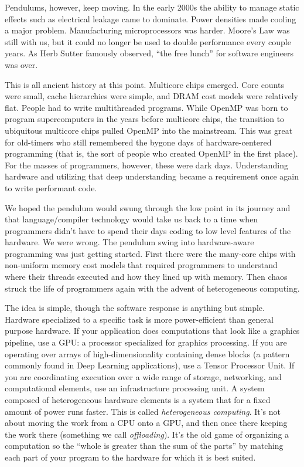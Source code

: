 Pendulums, however, keep moving.  In the early 2000s the ability to manage static effects such as electrical
leakage came to dominate.   Power densities made cooling a major problem.  Manufacturing  microprocessors was harder. Moore's Law was 
still with us, but it could no longer be used to double performance every couple years.
As Herb Sutter famously observed, ``the free lunch'' for software engineers was over. 

This is all ancient history at this point.  Multicore chips emerged.  Core counts were small, cache hierarchies were 
simple, and DRAM cost models were relatively flat.   People had to write multithreaded programs.   While OpenMP
was born to program supercomputers in the years before multicore chips,
the transition to ubiquitous multicore chips pulled OpenMP into the mainstream.  This was great for 
old-timers who still remembered the bygone days of hardware-centered programming (that is, the sort of people 
who created OpenMP in the first place). For the masses of programmers, however, these were dark days.
Understanding hardware and utilizing that deep understanding became a requirement once again to write performant code.

We hoped the pendulum would swung through the low point in its journey and that language/compiler technology
would take us back to a time when programmers didn't have to spend their days coding to low level features of the
hardware.  We were wrong.  The pendulum swing into hardware-aware programming was just getting started.
First there were the many-core chips with non-uniform memory cost models that required programmers to understand
where their threads executed and how they lined up with memory.  Then chaos struck the life of programmers again with
the advent of heterogeneous computing.

The idea is simple, though the software response is anything but simple.  Hardware specialized to a specific task is
more power-efficient than general purpose hardware.   If your application does computations that look like a graphics pipeline, 
use a GPU: a processor specialized for graphics processing.  If you are operating over arrays of high-dimensionality containing dense blocks
(a pattern commonly found in Deep Learning applications), use a Tensor Processor Unit.  If
you are coordinating execution over a wide range of storage, networking, and computational elements, use an infrastructure
processing unit. A system composed of heterogeneous hardware elements is a system that for a fixed amount of power runs faster.
This is called \emph{heterogeneous computing}.   It's not about moving the work from a CPU onto a GPU, and then once there 
keeping the work there (something we call \emph{offloading}).   It's the old game of organizing a computation 
so the ``whole is greater than the sum of the parts'' by matching each part of your program to the hardware for which it is best suited.

